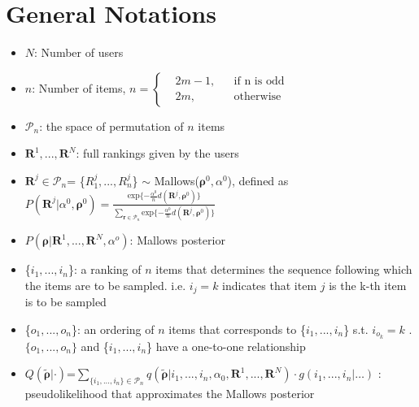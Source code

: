 \documentclass[11pt, oneside]{article}   	%
\title{}
\author{}
\date{}							%
\begin{document}
\maketitle
\section{General Notations}

\begin{itemize}

	\item {$N$: Number of users}
	
	\item {$n$: Number of items,    $
	n = \left \{
	\begin{aligned}
	&2m-1, && \text{if n is odd} \\
	&2m, && \text{otherwise}
	\end{aligned} \right.
	$}
	
	\item{$\mathcal{P}_n$: the space of permutation of $n$ items}
	\item {$\bm{R}^1,...,\bm{R}^N$: full rankings given by the users}
	
	
	\item {$\bm{R}^j \in \mathcal{P}_n$= \{$R^j_1,...,R^j_n$\} $\sim$ Mallows($\bm{\rho}^0, \alpha^0$), defined as 
	$P(\bm{R}^j|\alpha^0, \bm{\rho}^0) = \frac{\text{exp}\{-\frac{\alpha^0}{n}d(\bm{R}^j, \bm{\rho}^0)\}}{\sum\limits_{\bm{r}\in \mathcal{P}_n}\text{exp}\{-\frac{\alpha^0}{n}d(\bm{R}^j, \bm{\rho}^0)\}}$}
	
	
	\item {$P(\bm{\rho}|\bm{R}^1,...,\bm{R}^N,\alpha^o)$: Mallows posterior}
	
	
	\item{\{$i_1, ..., i_n$\}: a ranking of $n$ items that determines the sequence following which the items are to be sampled. i.e. $i_j = k$ indicates that item $j$ is the k-th item is to be sampled}
	
	\item{ \{$o_1, ..., o_n$\}: an ordering of $n$ items that corresponds to \{$i_1, ..., i_n$\} s.t. $i_{o_k} = k$ }. $\{o_1, ...,o_n\}$ and \{$i_1, ..., i_n$\} have a one-to-one relationship
	
	\item {$Q(\tilde{\bm{\rho}}|\cdot)$=$\sum\limits_{\{i_1, ..., i_n \}\in \mathcal{P}_n }q(\tilde{\bm{\rho}}|i_1, ..., i_n, \alpha_0, \bm{R}^1, ...,\bm{R}^N) \cdot g(i_1, ..., i_n| \dots)$ : pseudolikelihood that approximates the Mallows posterior}
	

\end{itemize}
\end{document}
